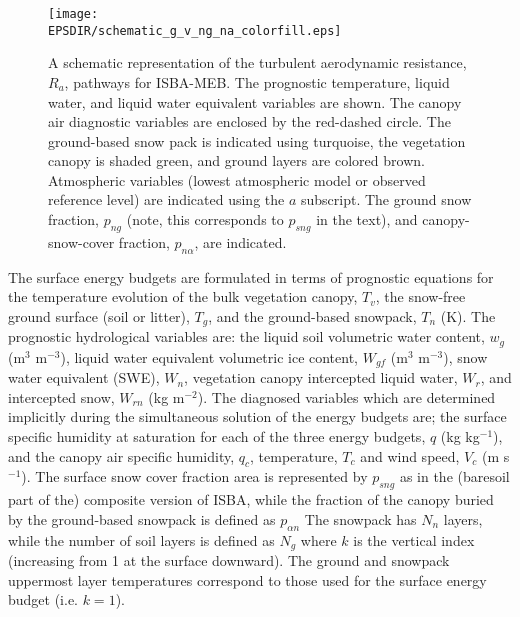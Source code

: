 \begin{figure}[!b]
\centerline{ 
\texttt{[image: \\EPSDIR/schematic\_g\_v\_ng\_na\_colorfill.eps]}}
\caption{
A schematic representation of 
the turbulent aerodynamic resistance, $R_{a}$, pathways for
ISBA-MEB. The prognostic temperature, liquid water, and liquid water
equivalent variables are shown.
The canopy air diagnostic variables are enclosed by the red-dashed circle.
The ground-based snow pack is indicated using
turquoise, the vegetation canopy is shaded green,
and ground layers are colored brown.
Atmospheric variables (lowest atmospheric 
model or observed reference level) are indicated using
the $a$ subscript.
The ground snow fraction, $p_{ng}$ (note, this corresponds to
$p_{sng}$ in the text), and canopy-snow-cover 
fraction, $p_{n\alpha}$, are indicated.
}
\label{fig:schematic_meb}
\end{figure}


The surface energy budgets are formulated in terms of prognostic
equations for the temperature evolution of the bulk vegetation canopy, $T_v$, 
the snow-free ground surface (soil or litter), $T_g$, and the
ground-based
snowpack, $T_n$ (K). The prognostic hydrological variables
are: the liquid soil volumetric water content, $w_g$ (m$^3$ m$^{-3}$),
liquid water equivalent volumetric
ice content, $W_{gf}$ (m$^3$ m$^{-3}$), snow water equivalent
(SWE), $W_n$,
vegetation canopy intercepted liquid water, $W_r$, and intercepted
snow, $W_{rn}$ (kg m$^{-2}$).  
%
The diagnosed variables which are determined implicitly during the
simultaneous solution of the energy budgets are; 
the surface specific humidity at saturation 
for each of the three energy budgets, $q$ (kg
kg$^{-1}$), and the canopy air specific humidity, $q_c$, temperature,
$T_c$ and wind speed, $V_c$ (m s$^{-1}$).
%
The surface snow cover fraction
area is represented by $p_{sng}$ as in the (baresoil part of the) 
composite version of ISBA, 
while the fraction of the canopy
buried by the ground-based snowpack is defined as $p_{\alpha n}$
%
The snowpack has $N_n$ layers, while the number of soil
layers is defined as $N_g$ where $k$ is the vertical index (increasing
from 1 at the surface downward). The ground and snowpack uppermost
layer temperatures 
correspond to those used for the surface energy budget (i.e. $k=1$).
%

